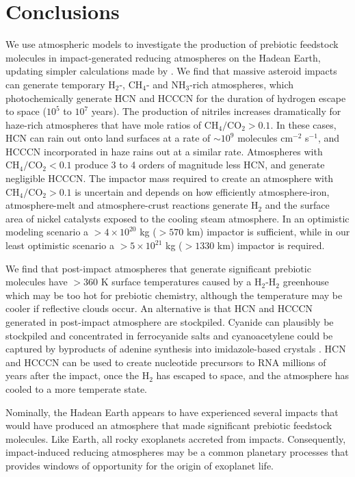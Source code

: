 \section{Conclusions}

We use atmospheric models to investigate the production of prebiotic feedstock molecules in impact-generated reducing atmospheres on the Hadean Earth, updating simpler calculations made by \citet{Zahnle_2020}. We find that massive asteroid impacts can generate temporary H$_2$-, CH$_4$- and NH$_3$-rich atmospheres, which photochemically generate HCN and HCCCN for the duration of hydrogen escape to space ($10^5$ to $10^7$ years). The production of nitriles increases dramatically for haze-rich atmospheres that have mole ratios of $\mathrm{CH_4}/\mathrm{CO_2} > 0.1$. In these cases, HCN can rain out onto land surfaces at a rate of $\sim 10^9$ molecules cm$^{-2}$ s$^{-1}$, and HCCCN incorporated in haze rains out at a similar rate. Atmospheres with $\mathrm{CH_4}/\mathrm{CO_2} < 0.1$ produce 3 to 4 orders of magnitude less HCN, and generate negligible HCCCN. The impactor mass required to create an atmosphere with $\mathrm{CH_4}/\mathrm{CO_2} > 0.1$ is uncertain and depends on how efficiently atmosphere-iron, atmosphere-melt and atmosphere-crust reactions generate H$_2$ and the surface area of nickel catalysts exposed to the cooling steam atmosphere. In an optimistic modeling scenario a $> 4 \times 10^{20}$ kg ($> 570$ km) impactor is sufficient, while in our least optimistic scenario a $> 5 \times 10^{21}$ kg ($> 1330$ km) impactor is required. 

We find that post-impact atmospheres that generate significant prebiotic molecules have $> 360$ K surface temperatures caused by a H$_2$-H$_2$ greenhouse which may be too hot for prebiotic chemistry, although the temperature may be cooler if reflective clouds occur. An alternative is that HCN and HCCCN generated in post-impact atmosphere are stockpiled. Cyanide can plausibly be stockpiled and concentrated in ferrocyanide salts and cyanoacetylene could be captured by byproducts of adenine synthesis into imidazole-based crystals \citep{Ritson_2022}. HCN and HCCCN can be used to create nucleotide precursors to RNA millions of years after the impact, once the H$_2$ has escaped to space, and the atmosphere has cooled to a more temperate state.

Nominally, the Hadean Earth appears to have experienced several impacts that would have produced an atmosphere that made significant prebiotic feedstock molecules. Like Earth, all rocky exoplanets accreted from impacts. Consequently, impact-induced reducing atmospheres may be a common planetary processes that provides windows of opportunity for the origin of exoplanet life.

